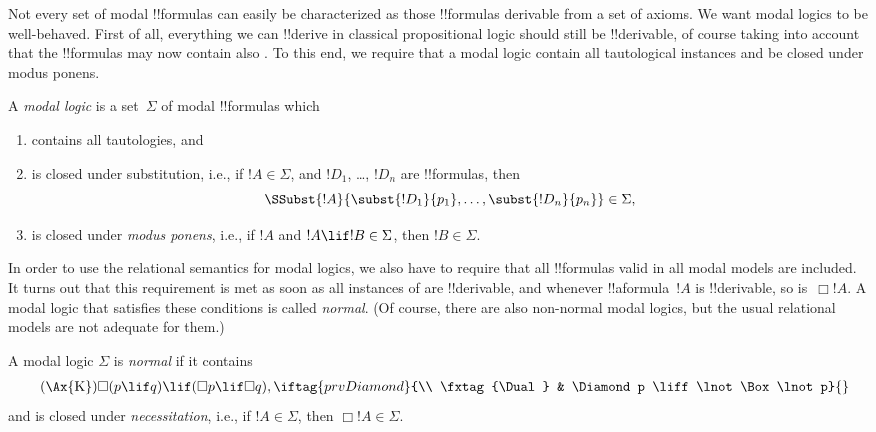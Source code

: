\documentclass[../../../include/open-logic-section]{subfiles}
\begin{document}


Not every set of modal !!{formula}s can easily be characterized as
those !!{formula}s derivable from a set of axioms. We want modal
logics to be well-behaved. First of all, everything we can !!{derive}
in classical propositional logic should still be !!{derivable}, of
course taking into account that the !!{formula}s may now contain also
. To this end, we
require that a modal logic contain all tautological instances and be
closed under modus ponens.

\begin{defn}
  A \emph{modal logic} is a set~$\Sigma$ of modal !!{formula}s which
  \begin{enumerate}
  \item contains all tautologies, and
  \item is closed under substitution, i.e., if $!A \in \Sigma$, and
    $!D_1$, \dots, $!D_n$ are !!{formula}s, then
    \[
    \SSubst{!A}{\subst{!D_1}{p_1}, \dots, \subst{!D_n}{p_n}} \in \Sigma,
    \]
    \item is closed under \emph{modus ponens}, i.e., if $!A$ and $!A
      \lif !B \in \Sigma$, then $!B \in \Sigma$.
  \end{enumerate}
\end{defn}

In order to use the relational semantics for modal logics, we also
have to require that all !!{formula}s valid in all modal models are
included. It turns out that this requirement is met as soon as all
instances of  are
!!{derivable}, and whenever !!a{formula}~$!A$ is !!{derivable}, so
is~$\Box !A$. A modal logic that satisfies these conditions is called
\emph{normal}. (Of course, there are also non-normal modal logics, but
the usual relational models are not adequate for them.)

\begin{defn}
  A modal logic $\Sigma$ is \emph{normal} if it contains
  \begin{align*}
    \tag{\Ax{K}} & \Box(p \lif q) \lif (\Box p \lif \Box q),
    \iftag{prvDiamond}{\\
      \tag{\Dual} & \Diamond p \liff \lnot\Box\lnot p}{}
  \end{align*}
  and is closed under \emph{necessitation}, i.e., if $!A \in
  \Sigma$, then $\Box !A \in \Sigma$.
\end{defn}
\end{document}
